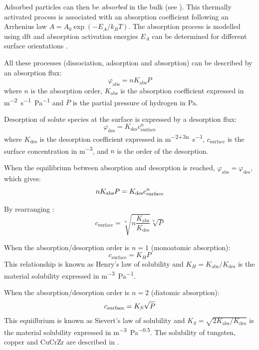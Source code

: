 Adsorbed particles can then be \textit{absorbed} in the bulk (see ).
This thermally activated process is associated with an absorption coefficient following an Arrhenius law $A=A_0 \exp{(-E_A/k_B T)}$.
The absorption process is modelled using \gls{dft} and absorption activation energies $E_A$ can be determined for different surface orientations .

All these processes (dissociation, adsorption and absorption) can be described by an absorption flux:
\begin{equation}
    \varphi_\mathrm{abs} = n K_\mathrm{abs} P
\end{equation}
where $n$ is the absorption order, $K_\mathrm{abs}$ is the absorption coefficient expressed in \si{m^{-2}.s^{-1}.Pa^{-1}} and $P$ is the partial pressure of hydrogen in \si{Pa}.

Desorption of solute species at the surface is expressed by a desorption flux:
\begin{equation}
    \varphi_\mathrm{des} = K_\mathrm{des} c_\mathrm{surface}^n
\end{equation}
where $K_\mathrm{des}$ is the desorption coefficient expressed in \si{m^{-2+3n}.s^{-1}}, $c_\mathrm{surface}$ is the surface concentration in \si{m^{-3}}, and $n$ is the order of the desorption.

When the equilibrium between absorption and desorption is reached, $\varphi_\mathrm{abs} = \varphi_\mathrm{des}$, which gives:
\begin{equation}
    n K_\mathrm{abs} P = K_\mathrm{des} c_\mathrm{surface}^n
    \labeq{equilibrium absorption desorption}
\end{equation}

By rearranging :
\begin{equation}
    c_\mathrm{surface} = \sqrt[n]{n \frac{K_\mathrm{abs}}{K_\mathrm{des}}} \sqrt[n]{P}
\end{equation}

When the absorption/desorption order is $n=1$ (monoatomic absorption):
\begin{equation}
    c_\mathrm{surface} = K_H P
\end{equation}
This relationship is known as Henry's law of solubility and $K_H = K_\mathrm{abs}/K_\mathrm{des}$ is the material solubility expressed in \si{m^{-3}.Pa^{-1}}.

When the absorption/desorption order is $n=2$ (diatomic absorption):
\begin{equation}
    c_\mathrm{surface} = K_S \sqrt{P}
    \labeq{sievert's law}
\end{equation}
This equiilbrium is known as Sievert's law of solubility and $K_S = \sqrt{2 K_\mathrm{abs}/K_\mathrm{des}}$ is the material solubility expressed in \si{m^{-3}.Pa^{-0.5}}.
The solubility of tungsten, copper and CuCrZr are described in .

